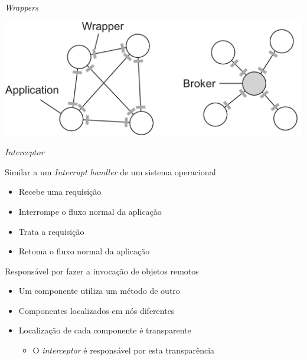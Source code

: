 \documentclass[compress]{beamer}
\begin{document}

\begin{frame}{\textit{Wrappers}}

\centering \includegraphics[width=\textwidth]{images/wrappers.png}

\end{frame}


\begin{frame}{\textit{Interceptor}}

Similar a um \textit{Interrupt handler} de um sistema operacional
\begin{itemize}
    \item Recebe uma requisição
    \item Interrompe o fluxo normal da aplicação
    \item Trata a requisição
    \item Retoma o fluxo normal da aplicação
\end{itemize}

Responsável por fazer a invocação de objetos remotos
\begin{itemize}
    \item Um componente utiliza um método de outro
    \item Componentes localizados em nós diferentes
    \item Localização de cada componente é transparente
    \begin{itemize}
        \item O \textit{interceptor} é responsável por esta transparência
    \end{itemize}
\end{itemize}
\end{frame}

\end{document}
